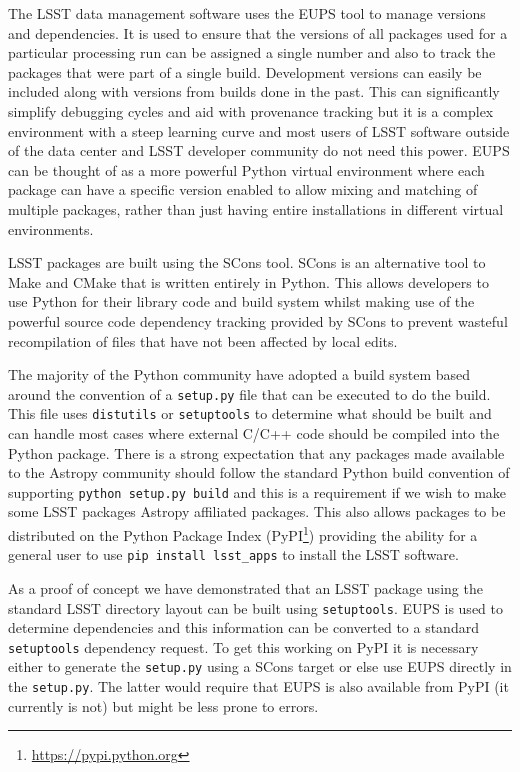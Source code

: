 \documentclass[]{spie}  %
\begin{document}
\label{sec:packaging}

The LSST data management software uses the EUPS tool\cite{EUPS} to manage versions and dependencies.
It is used to ensure that the versions of all packages used for a particular processing run can be assigned a single number and also to track the packages that were part of a single build.
Development versions can easily be included along with versions from builds done in the past.
This can significantly simplify debugging cycles and aid with provenance tracking but it is a complex environment with a steep learning curve and most users of LSST software outside of the data center and LSST developer community do not need this power.
EUPS can be thought of as a more powerful Python virtual environment where each package can have a specific version enabled to allow mixing and matching of multiple packages, rather than just having entire installations in different virtual environments.

LSST packages are built using the SCons tool\cite{2005Scons1377085}.
SCons is an alternative tool to Make and CMake that is written entirely in Python.
This allows developers to use Python for their library code and build system whilst making use of the powerful source code dependency tracking provided by SCons to prevent wasteful recompilation of files that have not been affected by local edits.

The majority of the Python community have adopted a build system based around the convention of a \texttt{setup.py} file that can be executed to do the build.
This file uses \texttt{distutils} or \texttt{setuptools} to determine what should be built and can handle most cases where external C/C++ code should be compiled into the Python package.
There is a strong expectation that any packages made available to the Astropy community should follow the standard Python build convention of supporting \texttt{python setup.py build} and this is a requirement if we wish to make some LSST packages Astropy affiliated packages.
This also allows packages to be distributed on the Python Package Index (PyPI\footnote{\url{https://pypi.python.org}}) providing the ability for a general user to use \texttt{pip install lsst\_apps} to install the LSST software.

As a proof of concept we have demonstrated that an LSST package using the standard LSST directory layout can be built using \texttt{setuptools}.
EUPS is used to determine dependencies and this information can be converted to a standard \texttt{setuptools} dependency request.
To get this working on PyPI it is necessary either to generate the \texttt{setup.py} using a SCons target or else use EUPS directly in the \texttt{setup.py}.
The latter would require that EUPS is also available from PyPI (it currently is not) but might be less prone to errors.
\end{document}
